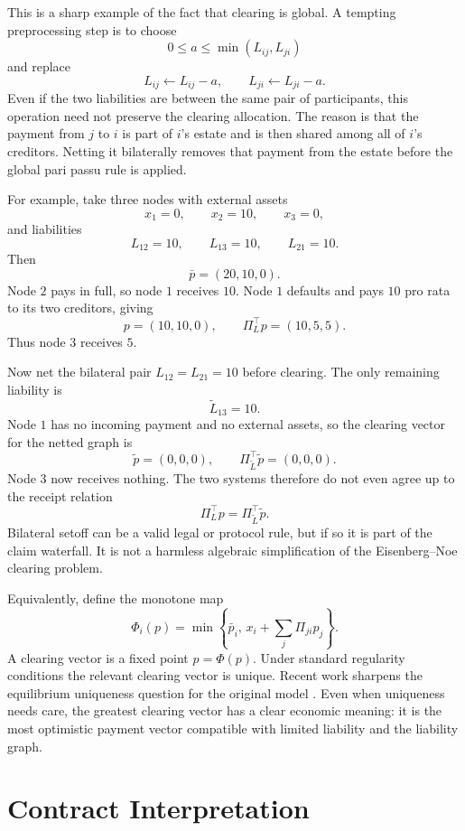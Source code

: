 \documentclass[11pt,oneside]{article}
\newcommand{\barp}{\bar p}
\begin{document}
This is a sharp example of the fact that clearing is global. A tempting
preprocessing step is to choose
\[
  0\leq a\leq \min(L_{ij},L_{ji})
\]
and replace
\[
  L_{ij}\leftarrow L_{ij}-a,
  \qquad
  L_{ji}\leftarrow L_{ji}-a.
\]
Even if the two liabilities are between the same pair of participants, this
operation need not preserve the clearing allocation. The reason is that the
payment from $j$ to $i$ is part of $i$'s estate and is then shared among all of
$i$'s creditors. Netting it bilaterally removes that payment from the estate
before the global pari passu rule is applied.

For example, take three nodes with external assets
\[
  x_1=0,\qquad x_2=10,\qquad x_3=0,
\]
and liabilities
\[
  L_{12}=10,\qquad L_{13}=10,\qquad L_{21}=10.
\]
Then
\[
  \barp=(20,10,0).
\]
Node $2$ pays in full, so node $1$ receives $10$. Node $1$ defaults and pays
$10$ pro rata to its two creditors, giving
\[
  p=(10,10,0),
  \qquad
  \Pi_L^\top p=(10,5,5).
\]
Thus node $3$ receives $5$.

Now net the bilateral pair $L_{12}=L_{21}=10$ before clearing. The only
remaining liability is
\[
  \widetilde L_{13}=10.
\]
Node $1$ has no incoming payment and no external assets, so the clearing vector
for the netted graph is
\[
  \widetilde p=(0,0,0),
  \qquad
  \Pi_{\widetilde L}^{\top}\widetilde p=(0,0,0).
\]
Node $3$ now receives nothing. The two systems therefore do not even agree up
to the receipt relation
\[
  \Pi_L^\top p=\Pi_{\widetilde L}^{\top}\widetilde p.
\]
Bilateral setoff can be a valid legal or protocol rule, but if so it is part of
the claim waterfall. It is not a harmless algebraic simplification of the
Eisenberg--Noe clearing problem.

Equivalently, define the monotone map
\[
  \Phi_i(p)=
  \min\left\{
    \barp_i,\,
    x_i + \sum_j \Pi_{ji}p_j
  \right\}.
\]
A clearing vector is a fixed point $p=\Phi(p)$. Under standard regularity
conditions the relevant clearing vector is unique. Recent work sharpens the
equilibrium uniqueness question for the original model
\cite{stachurski2022properties}. Even when uniqueness needs care, the greatest
clearing vector has a clear economic meaning: it is the most optimistic payment
vector compatible with limited liability and the liability graph.

\section{Contract Interpretation}
\end{document}
